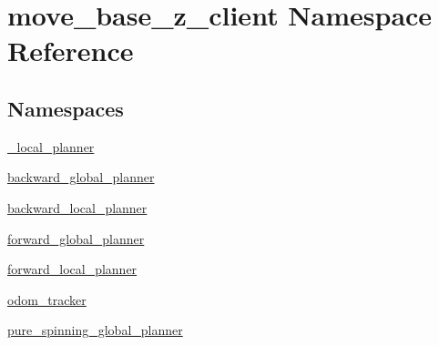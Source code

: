 \hypertarget{namespacemove__base__z__client}{}\section{move\+\_\+base\+\_\+z\+\_\+client Namespace Reference}
\label{namespacemove__base__z__client}
\subsection*{Namespaces}
\begin{DoxyCompactItemize}
\item 
 \hyperlink{namespacemove__base__z__client_1_1__local__planner}{\+\_\+local\+\_\+planner}
\item 
 \hyperlink{namespacemove__base__z__client_1_1backward__global__planner}{backward\+\_\+global\+\_\+planner}
\item 
 \hyperlink{namespacemove__base__z__client_1_1backward__local__planner}{backward\+\_\+local\+\_\+planner}
\item 
 \hyperlink{namespacemove__base__z__client_1_1forward__global__planner}{forward\+\_\+global\+\_\+planner}
\item 
 \hyperlink{namespacemove__base__z__client_1_1forward__local__planner}{forward\+\_\+local\+\_\+planner}
\item 
 \hyperlink{namespacemove__base__z__client_1_1odom__tracker}{odom\+\_\+tracker}
\item 
 \hyperlink{namespacemove__base__z__client_1_1pure__spinning__global__planner}{pure\+\_\+spinning\+\_\+global\+\_\+planner}
\end{DoxyCompactItemize}
